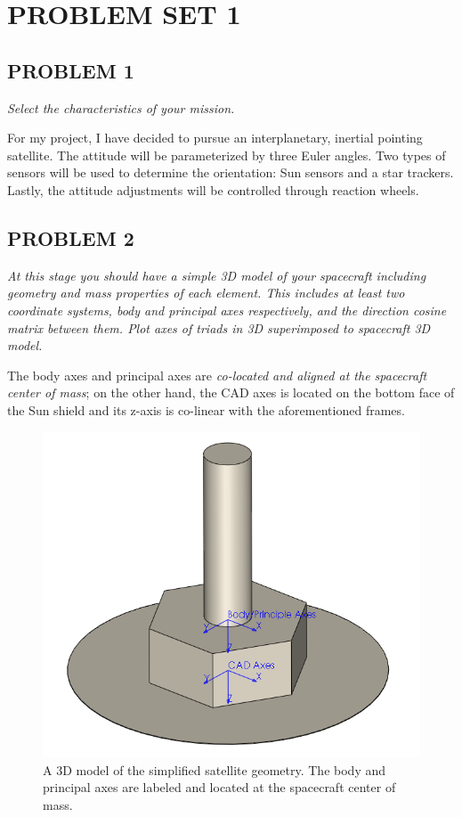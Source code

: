 \section{\Large PROBLEM SET 1}
\subsection{PROBLEM 1}
\textit{Select the characteristics of your mission.}

For my project, I have decided to pursue an interplanetary, inertial pointing satellite. The attitude will be parameterized by three Euler angles. Two types of sensors will be used to determine the orientation: Sun sensors and a star trackers. Lastly, the attitude adjustments will be controlled through reaction wheels.

\subsection{PROBLEM 2}
\textit{At this stage you should have a simple 3D model of your spacecraft including geometry and mass properties of each element. This includes at least two coordinate systems, body and principal axes respectively, and the direction cosine matrix between them. Plot axes of triads in 3D superimposed to spacecraft 3D model.}

The body axes and principal axes are \textit{co-located and aligned at the spacecraft center of mass}; on the other hand, the CAD axes is located on the bottom face of the Sun shield and its z-axis is co-linear with the aforementioned frames.

\begin{figure}[H]
\centering
\includegraphics[scale=0.7]{Images/WMAP_CAD4.PNG}
\caption{A 3D model of the simplified satellite geometry. The body and principal axes are labeled and located at the spacecraft center of mass.}
\label{CAD model with frames}
\end{figure}



